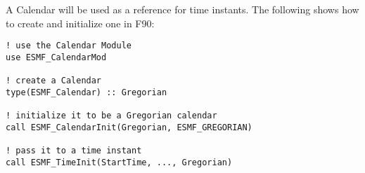 
A Calendar will be used as a reference for time instants.
The following shows how to create and initialize one in F90:

\begin{verbatim}
! use the Calendar Module
use ESMF_CalendarMod

! create a Calendar
type(ESMF_Calendar) :: Gregorian

! initialize it to be a Gregorian calendar
call ESMF_CalendarInit(Gregorian, ESMF_GREGORIAN)

! pass it to a time instant
call ESMF_TimeInit(StartTime, ..., Gregorian)
\end{verbatim}
